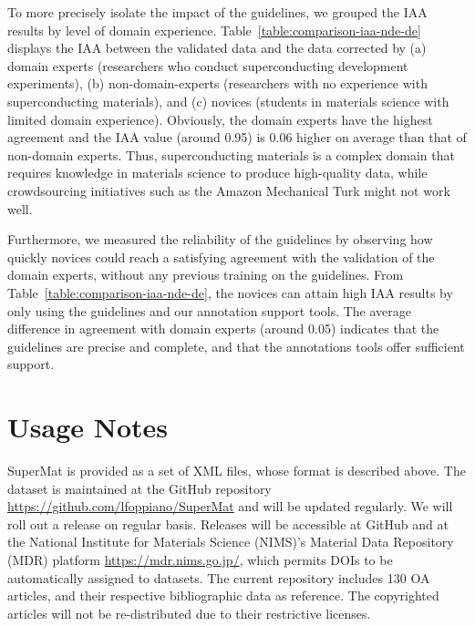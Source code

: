 \documentclass[fleqn,10pt]{wlscirep}
\begin{document}
To more precisely isolate the impact of the guidelines, we grouped the IAA results by level of domain experience. 
Table~\ref{table:comparison-iaa-nde-de} displays the IAA between the validated data and the data corrected by (a) domain experts (researchers who conduct superconducting development experiments), (b) non-domain-experts (researchers with no experience with superconducting materials), and (c) novices (students in materials science with limited domain experience). 
Obviously, the domain experts have the highest agreement and the IAA value (around 0.95) is 0.06 higher on average than that of non-domain experts. 
Thus, superconducting materials is a complex domain that requires knowledge in materials science to produce high-quality data, while crowdsourcing initiatives such as the Amazon Mechanical Turk might not work well. 

Furthermore, we measured the reliability of the guidelines by observing how quickly novices could reach a satisfying agreement with the validation of the domain experts, without any previous training on the guidelines.
From Table~\ref{table:comparison-iaa-nde-de}, the  novices can attain high IAA results by only using the guidelines and our annotation support tools. 
The average difference in agreement with domain experts (around 0.05) indicates that the guidelines are precise and complete, and that the annotations tools offer sufficient support. 

\section*{Usage Notes}
\label{sec:usage-notes}
SuperMat is provided as a set of XML files, whose format is described above. 
The dataset is maintained at the GitHub repository  \url{https://github.com/lfoppiano/SuperMat} and will be updated regularly. 
We will roll out a release on regular basis. 
Releases will be accessible at GitHub and at the National Institute for Materials Science (NIMS)'s Material Data Repository (MDR) platform \url{https://mdr.nims.go.jp/}, which permits DOIs to be automatically assigned to datasets.
The current repository includes 130 OA articles, and their respective bibliographic data as reference. 
The copyrighted articles will not be re-distributed due to their restrictive licenses.
\end{document}

